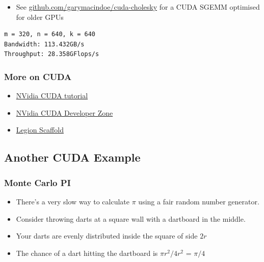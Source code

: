 \begin{itemize}
\itemsep1pt\parskip0pt
\item
  See
  \href{https://github.com/garymacindoe/cuda-cholesky/blob/master/blas/sgemm.cu}{github.com/garymacindoe/cuda-cholesky}
  for a CUDA SGEMM optimised for older GPUs
\end{itemize}

\begin{verbatim}
m = 320, n = 640, k = 640
Bandwidth: 113.432GB/s
Throughput: 28.358GFlops/s
\end{verbatim}

\subsubsection{More on CUDA}\label{more-on-cuda}

\begin{itemize}
\itemsep1pt\parskip0pt
\item
  \href{http://www.nvidia.com/docs/IO/116711/sc11-cuda-c-basics.pdf}{NVidia
  CUDA tutorial}
\item
  \href{https://developer.nvidia.com/cuda-zone}{NVidia CUDA Developer
  Zone}
\item
  \href{https://github.com/UCL-RITS/Legion-Fabric-Scaffold/blob/gpu-c-cuda/src/cuda_main.cu}{Legion
  Scaffold}
\end{itemize}

\subsection{Another CUDA Example}\label{another-cuda-example}

\subsubsection{Monte Carlo PI}\label{monte-carlo-pi}

\begin{itemize}
\itemsep1pt\parskip0pt
\item
  There's a very slow way to calculate $\pi$ using a fair random number
  generator.
\item
  Consider throwing darts at a square wall with a dartboard in the
  middle.
\item
  Your darts are evenly distributed inside the square of side $2r$
\item
  The chance of a dart hitting the dartboard is $\pi r^2/4r^2$ = $\pi/4$
\end{itemize}

